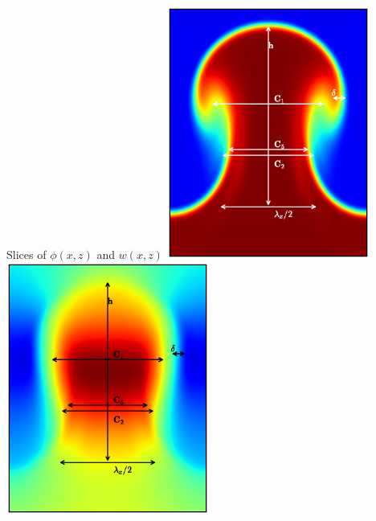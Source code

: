 \documentclass[12pt]{beamer}
\begin{document}
\begin{frame}{Slices of $\phi(x,z)$ and $w(x,z)$}
\includegraphics[width=0.5\textwidth]{graphics/slice.eps}
\includegraphics[width=0.5\textwidth]{graphics/slice_w.eps}
\end{frame}
\end{document}
